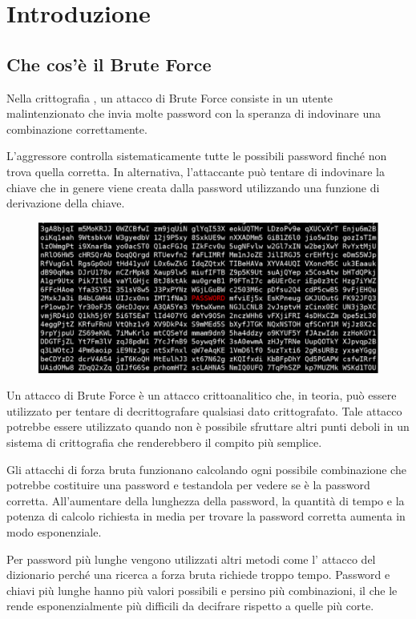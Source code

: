 \chapter{Introduzione}
\section{Che cos'è il Brute Force}
Nella crittografia , un attacco di Brute Force consiste in un utente malintenzionato che invia molte password con la speranza di indovinare una combinazione correttamente.

L'aggressore controlla sistematicamente tutte le possibili password finché non trova quella corretta. In alternativa, l'attaccante può tentare di indovinare la chiave che in genere viene creata dalla password utilizzando una funzione di derivazione della chiave.
\begin{figure}[h]
    \centering
    \includegraphics[width=115mm]{Immagini/introduzione/banner.png}
\end{figure}

Un attacco di Brute Force è un attacco crittoanalitico che, in teoria, può essere utilizzato per tentare di decrittografare qualsiasi dato crittografato. Tale attacco potrebbe essere utilizzato quando non è possibile sfruttare altri punti deboli in un sistema di crittografia che renderebbero il compito più semplice.

Gli attacchi di forza bruta funzionano calcolando ogni possibile combinazione che potrebbe costituire una password e testandola per vedere se è la password corretta. All'aumentare della lunghezza della password, la quantità di tempo e la potenza di calcolo richiesta in media per trovare la password corretta aumenta in modo esponenziale.

Per password più lunghe vengono utilizzati altri metodi come l' attacco del dizionario perché una ricerca a forza bruta richiede troppo tempo. Password e chiavi più lunghe hanno più valori possibili e persino più combinazioni, il che le rende esponenzialmente più difficili da decifrare rispetto a quelle più corte.

